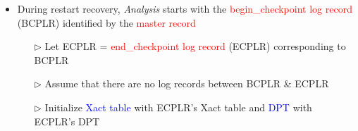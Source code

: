 \documentclass[10pt,landscape]{article}
\newcommand{\1}{\mathmybb{1}}
\begin{document}
\begin{multicols*}{3}
\begin{itemize}
    \item During restart recovery, \textit{Analysis} starts with the \textcolor{red}{begin\_checkpoint log record} (BCPLR) identified by the \textcolor{red}{master record}
    \begin{itemize}
        \item[$\triangleright$] Let ECPLR = \textcolor{red}{end\_checkpoint log record} (ECPLR) corresponding to BCPLR
        \item[$\triangleright$] Assume that there are no log records between BCPLR \& ECPLR
        \item[$\triangleright$] Initialize \textcolor{blue}{Xact table} with ECPLR's Xact table and \textcolor{blue}{DPT} with ECPLR's DPT
    \end{itemize}
\end{itemize}



\end{multicols*}
\end{document}
